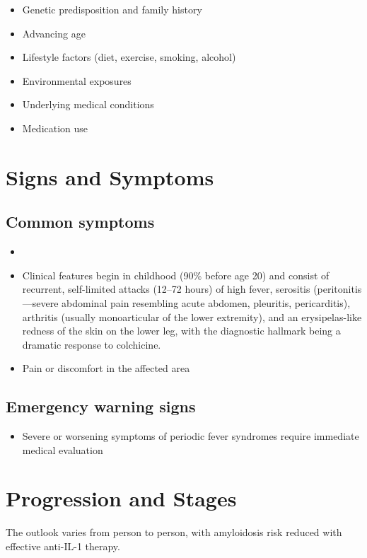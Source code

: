 \begin{itemize}[noitemsep]
  \item Genetic predisposition and family history
  \item Advancing age
  \item Lifestyle factors (diet, exercise, smoking, alcohol)
  \item Environmental exposures
  \item Underlying medical conditions
  \item Medication use
\end{itemize}
\section{Signs and Symptoms}

\subsection{Common symptoms}
\begin{itemize}[noitemsep]
  \item \item Clinical features begin in childhood (90\% before age 20) and consist of recurrent, self-limited attacks (12--72 hours) of high fever, serositis (peritonitis---severe abdominal pain resembling acute abdomen, pleuritis, pericarditis), arthritis (usually monoarticular of the lower extremity), and an erysipelas-like redness of the skin on the lower leg, with the diagnostic hallmark being a dramatic response to colchicine.

  \item Pain or discomfort in the affected area
  \end{itemize}

\subsection{Emergency warning signs}
\begin{itemize}[noitemsep]
  \item Severe or worsening symptoms of periodic fever syndromes require immediate medical evaluation
\end{itemize}
\section{Progression and Stages}
The outlook varies from person to person, with amyloidosis risk reduced with effective anti-IL-1 therapy.

